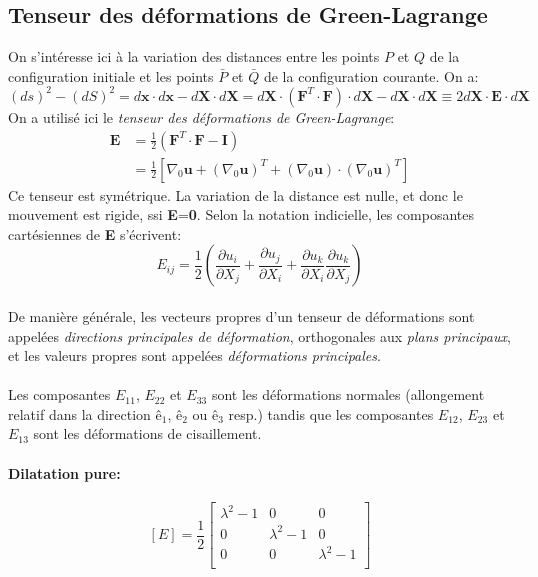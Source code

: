\subsection{Tenseur des déformations de Green-Lagrange}
On s'intéresse ici à la variation des distances entre les points $P$ et $Q$ de la configuration initiale et les points $\bar{P}$ et $\bar{Q}$ de la configuration courante. On a:
$$(ds)^2-(dS)^2=d\textbf{x}\cdot d\textbf{x}-d\textbf{X}\cdot d\textbf{X}=d\textbf{X}\cdot(\textbf{F}^T\cdot\textbf{F})\cdot d\textbf{X}-d\textbf{X}\cdot d\textbf{X} \equiv 2d\textbf{X}\cdot \textbf{E} \cdot d\textbf{X}$$
On a utilisé ici le \emph{tenseur des déformations de Green-Lagrange}: 
$$\begin{aligned}
\textbf{E}&=\frac{1}{2}(\textbf{F}^T\cdot \textbf{F}-\textbf{I})\\
 &=\frac{1}{2}[\nabla_0\textbf{u}+(\nabla_0\textbf{u})^T + (\nabla_0\textbf{u})\cdot(\nabla_0\textbf{u})^T ]
 \end{aligned}
$$
Ce tenseur est symétrique. La variation de la distance est nulle, et donc le mouvement est rigide, ssi \textbf{E}=\textbf{0}. Selon la notation indicielle, les composantes cartésiennes de \textbf{E} s'écrivent:
$$E_{ij}=\frac{1}{2}\left(\frac{\partial u_i}{\partial X_j}+\frac{\partial u_j}{\partial X_i}+\frac{\partial u_k}{\partial X_i}\frac{\partial u_k}{\partial X_j}\right)$$
\paragraph{}
De manière générale, les vecteurs propres d'un tenseur de déformations sont appelées \emph{directions principales de déformation}, orthogonales aux \emph{plans principaux}, et les valeurs propres sont appelées \emph{déformations principales}.
\paragraph{}
Les composantes $E_{11}$, $E_{22}$ et $E_{33}$ sont les déformations normales (allongement relatif dans la direction $\textbf{ê}_1$, $\textbf{ê}_2$ ou $\textbf{ê}_3$ resp.) tandis que les composantes $E_{12}$, $E_{23}$ et $E_{13}$ sont les déformations de cisaillement.
\paragraph{Dilatation pure:}
$$[E]=\frac{1}{2}
\left[\begin{array}{ccc}
\lambda^2-1&0&0\\
0&\lambda^2-1&0\\
0&0&\lambda^2-1\\
\end{array}\right]$$
